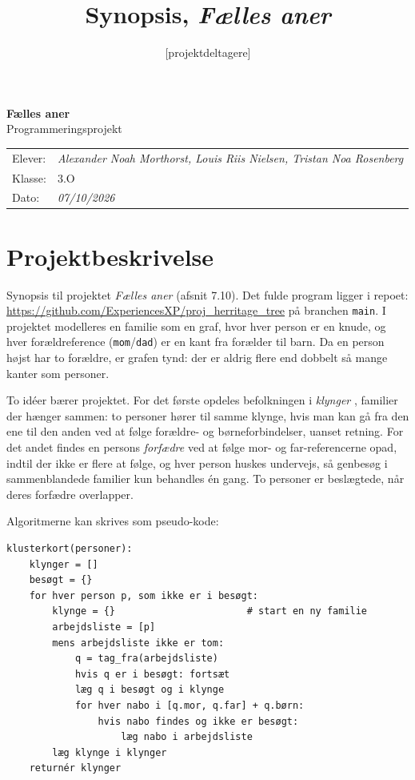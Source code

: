 \documentclass[12pt, a4paper]{article}
\title{Synopsis, \textit{Fælles aner}}
\author{[projektdeltagere]}
\date{}
\begin{document}
\thispagestyle{empty}
\begin{center}
{\LARGE\bfseries Fælles aner}\\[1em]
{\large Programmeringsprojekt}\\[2.5em]
\begin{tabular}{ll}
Elever: & \textit{Alexander Noah Morthorst, Louis Riis Nielsen, Tristan Noa Rosenberg} \\
Klasse: & 3.O \\
Dato: & \textit{07/10/2026} \\
\end{tabular}
\end{center}

\tableofcontents

\newpage

\section{Projektbeskrivelse}
\noindent Synopsis til projektet \emph{Fælles aner} (afsnit 7.10). Det fulde
program ligger i repoet: \url{https://github.com/ExperiencesXP/proj_herritage_tree} på branchen \texttt{main}.
I projektet modelleres en familie som en graf, hvor hver person er en knude, og
hver forældreference (\texttt{mom}/\texttt{dad}) er en kant fra forælder til
barn. Da en person højst har to forældre, er grafen tynd: der er aldrig flere
end dobbelt så mange kanter som personer.

To idéer bærer projektet. For det første opdeles befolkningen i \emph{klynger}
, familier der hænger sammen: to personer hører til samme klynge, hvis man
kan gå fra den ene til den anden ved at følge forældre- og børneforbindelser,
uanset retning. For det andet findes en persons \emph{forfædre} ved at følge
mor- og far-referencerne opad, indtil der ikke er flere at følge, og hver
person huskes undervejs, så genbesøg i sammenblandede familier kun behandles
én gang. To personer er beslægtede, når deres forfædre overlapper.

Algoritmerne kan skrives som pseudo-kode:

\begin{lstlisting}[basicstyle=\ttfamily\small, numbers=none]
klusterkort(personer):
    klynger = []
    besøgt = {}
    for hver person p, som ikke er i besøgt:
        klynge = {}                       # start en ny familie
        arbejdsliste = [p]
        mens arbejdsliste ikke er tom:
            q = tag_fra(arbejdsliste)
            hvis q er i besøgt: fortsæt
            læg q i besøgt og i klynge
            for hver nabo i [q.mor, q.far] + q.børn:
                hvis nabo findes og ikke er besøgt:
                    læg nabo i arbejdsliste
        læg klynge i klynger
    returnér klynger
\end{lstlisting}
\end{document}

